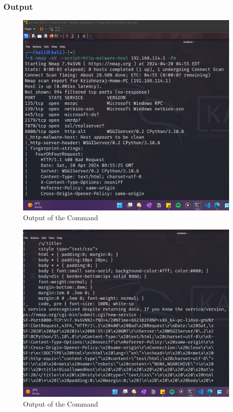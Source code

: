 \documentclass[11pt]{article}
\begin{document}
\subsubsection*{Output}
\begin{figure}[H]
    \centering
    \includegraphics[width=0.99\textwidth]{a3_ss (8).png}
    \caption{Output of the Command}
\end{figure}

\begin{figure}[H]
    \centering
    \includegraphics[width=0.99\textwidth]{a3_ss (9).png}
    \caption{Output of the Command}
\end{figure}
\end{document}
